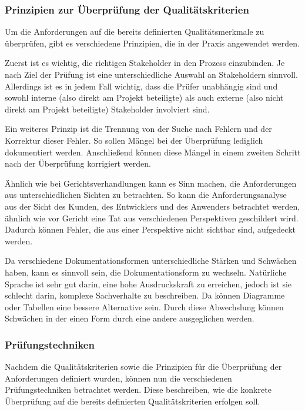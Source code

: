 \subsubsection{Prinzipien zur Überprüfung der Qualitätskriterien}
Um die Anforderungen auf die bereits definierten Qualitätsmerkmale zu überprüfen, gibt es verschiedene Prinzipien, die in der Praxis angewendet werden.

Zuerst ist es wichtig, die richtigen Stakeholder in den Prozess einzubinden.
Je nach Ziel der Prüfung ist eine unterschiedliche Auswahl an Stakeholdern sinnvoll.
Allerdings ist es in jedem Fall wichtig, dass die Prüfer unabhängig sind und sowohl interne (also direkt am Projekt beteiligte) als auch externe (also nicht direkt am Projekt beteiligte) Stakeholder involviert sind\autocite[vgl.][Seite 26]{Maulhardt.c}.

Ein weiteres Prinzip ist die Trennung von der Suche nach Fehlern und der Korrektur dieser Fehler.
So sollen Mängel bei der Überprüfung lediglich dokumentiert werden.
Anschließend können diese Mängel in einem zweiten Schritt nach der Überprüfung korrigiert werden\autocite[vgl.][Seite 26]{Maulhardt.c}.

Ähnlich wie bei Gerichtsverhandlungen kann es Sinn machen, die Anforderungen aus unterschiedlichen Sichten zu betrachten.
So kann die Anforderungsanalyse aus der Sicht des Kunden, des Entwicklers und des Anwenders betrachtet werden, ähnlich wie vor Gericht eine Tat aus verschiedenen Perspektiven geschildert wird.
Dadurch können Fehler, die aus einer Perspektive nicht sichtbar sind, aufgedeckt werden\autocite[vgl.][Seite 27]{Maulhardt.c}.

Da verschiedene Dokumentationsformen unterschiedliche Stärken und Schwächen haben, kann es sinnvoll sein, die Dokumentationsform zu wechseln.
Natürliche Sprache ist sehr gut darin, eine hohe Ausdruckskraft zu erreichen, jedoch ist sie schlecht darin, komplexe Sachverhalte zu beschreiben.
Da können Diagramme oder Tabellen eine bessere Alternative sein.
Durch diese Abwechslung können Schwächen in der einen Form durch eine andere ausgeglichen werden\autocite[vgl.][Seite 28]{Maulhardt.c}.

\subsubsection{Prüfungstechniken}
Nachdem die Qualitätskriterien sowie die Prinzipien für die Überprüfung der Anforderungen definiert wurden, können nun die verschiedenen Prüfungstechniken betrachtet werden.
Diese beschreiben, wie die konkrete Überprüfung auf die bereits definierten Qualitätskriterien erfolgen soll.

